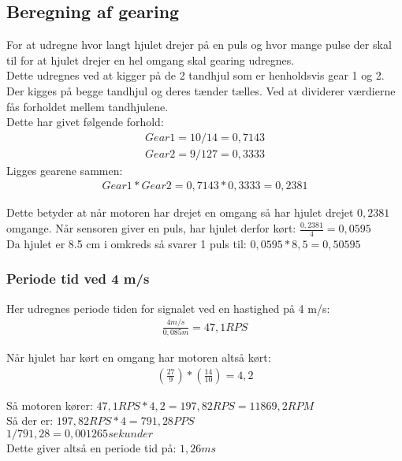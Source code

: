 \subsection{Beregning af gearing}
\label{beregn_gear}

For at udregne hvor langt hjulet drejer på en puls og hvor mange pulse der skal til for at hjulet drejer en hel omgang skal gearing udregnes. \\
Dette udregnes ved at kigger på de 2 tandhjul som er henholdsvis gear 1 og 2. Der kigges på begge tandhjul og deres tænder tælles. Ved at dividerer værdierne fås forholdet mellem tandhjulene. \\
Dette har givet følgende forhold:
\begin{align*}
Gear1 = 10 / 14 = 0,7143 \\
Gear2 = 9 / 127 = 0,3333
\end{align*}
Ligges gearene sammen:
\begin{align*}
Gear1*Gear2 = 0,7143 * 0,3333 = 0,2381
\end{align*}

Dette betyder at når motoren har drejet en omgang så har hjulet drejet \(0,2381\) omgange.
Når sensoren giver en puls, har hjulet derfor kørt: \(\frac{0,2381}{4} = 0,0595\) \\
Da hjulet er 8.5 cm i omkreds så svarer 1 puls til: \(0,0595*8,5 = 0,50595\)

\subsubsection{Periode tid ved 4 m/s}
\label{periode_4ms}
Her udregnes periode tiden for signalet ved en hastighed på 4 m/s:
\begin{align*}
\frac{4m/s}{0,085m} = 47,1 RPS
\end{align*}

Når hjulet har kørt en omgang har motoren altså kørt:
\begin{align*}
(\frac{27}{9}) * (\frac{14}{10}) = 4,2
\end{align*}

Så motoren kører: \(47,1 RPS * 4,2 = 197,82 RPS = 11869,2 RPM \) \\
Så der er: \(197,82 RPS *4 = 791,28 PPS \) \\
\(1/791,28 = 0,001265 sekunder \) \\
Dette giver altså en periode tid på: \(1,26 ms\)
